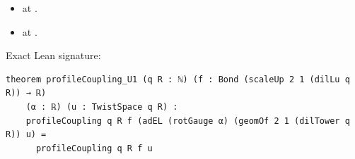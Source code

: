 \begin{theorem}[bp-330]
\begin{itemize}
\item \texttt{} at \texttt{}.
\item \texttt{} at \texttt{}.
\end{itemize}
\par Exact Lean signature:
\begin{verbatim}
theorem profileCoupling_U1 (q R : ℕ) (f : Bond (scaleUp 2 1 (dilLu q R)) → ℝ)
    (α : ℝ) (u : TwistSpace q R) :
    profileCoupling q R f (adEL (rotGauge α) (geomOf 2 1 (dilTower q R)) u) =
      profileCoupling q R f u
\end{verbatim}
\end{theorem}

